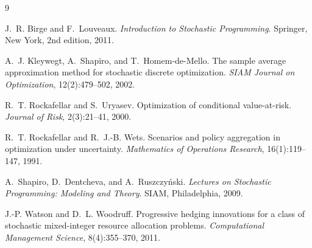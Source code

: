 \documentclass[11pt]{article}
\begin{document}
\begin{thebibliography}{9}

J.~R. Birge and F.~Louveaux.
\textit{Introduction to Stochastic Programming}.
Springer, New York, 2nd edition, 2011.

A.~J. Kleywegt, A.~Shapiro, and T.~Homem-de-Mello.
The sample average approximation method for stochastic discrete optimization.
\textit{SIAM Journal on Optimization}, 12(2):479--502, 2002.

R.~T. Rockafellar and S.~Uryasev.
Optimization of conditional value-at-risk.
\textit{Journal of Risk}, 2(3):21--41, 2000.

R.~T. Rockafellar and R.~J.-B. Wets.
Scenarios and policy aggregation in optimization under uncertainty.
\textit{Mathematics of Operations Research}, 16(1):119--147, 1991.

A.~Shapiro, D.~Dentcheva, and A.~Ruszczy\'nski.
\textit{Lectures on Stochastic Programming: Modeling and Theory}.
SIAM, Philadelphia, 2009.

J.-P. Watson and D.~L. Woodruff.
Progressive hedging innovations for a class of stochastic mixed-integer
resource allocation problems.
\textit{Computational Management Science}, 8(4):355--370, 2011.

\end{thebibliography}
\end{document}
